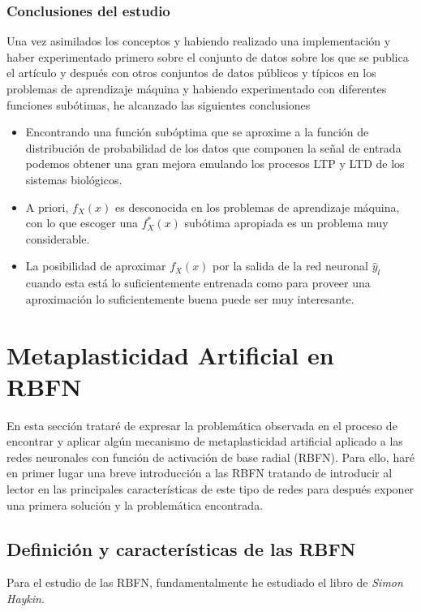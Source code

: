 \documentclass[10pt,a4paper]{report}
\begin{document}

\subsubsection{Conclusiones del estudio}
Una vez asimilados los conceptos y habiendo realizado una implementación y haber experimentado primero sobre el conjunto de datos sobre los que se publica el artículo y después con otros conjuntos de datos públicos y típicos en los problemas de aprendizaje máquina y habiendo experimentado con diferentes funciones subótimas, he alcanzado las siguientes conclusiones
\begin{itemize}
	\item Encontrando una función subóptima que se aproxime a la función de distribución de probabilidad de los datos que componen la señal de entrada podemos obtener una gran mejora emulando los procesos LTP y LTD de los sistemas biológicos.
	\item A priori, $f_X(x)$ es desconocida en los problemas de aprendizaje máquina, con lo que escoger una $f^*_X(x)$ subótima apropiada es un problema muy considerable.
	\item La posibilidad de aproximar $f_X(x)$ por la salida de la red neuronal $\widehat{y}_l$ cuando esta está lo suficientemente entrenada como para proveer una aproximación lo suficientemente buena puede ser muy interesante.
\end{itemize}

\section{Metaplasticidad Artificial en RBFN}
En esta sección trataré de expresar la problemática observada en el proceso de encontrar y aplicar algún mecanismo de metaplasticidad artificial aplicado a las redes neuronales con función de activación de base radial (RBFN). Para ello, haré en primer lugar una breve introducción a las RBFN tratando de introducir al lector en las principales características de este tipo de redes para después exponer una primera solución y la problemática encontrada.
\subsection{Definición y características de las RBFN}
Para el estudio de las RBFN, fundamentalmente he estudiado el libro de \textit{Simon Haykin}\cite{haykin99a}. 
\end{document}
